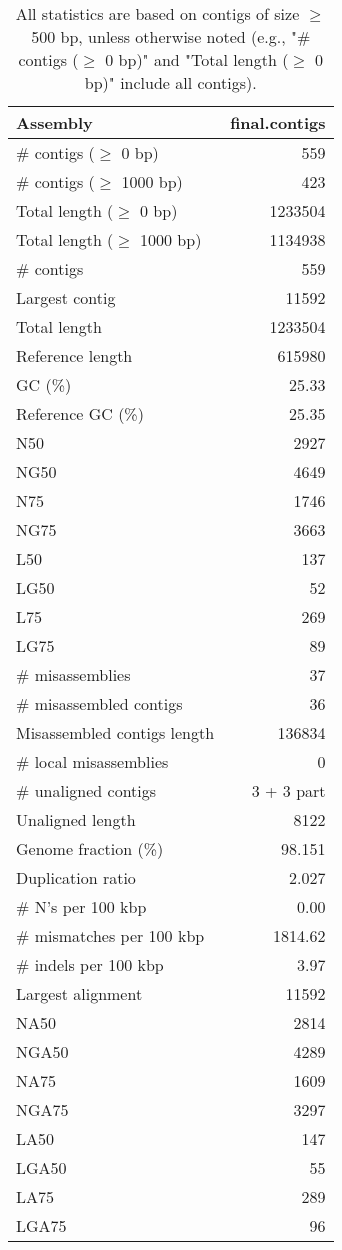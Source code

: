 \documentclass[12pt,a4paper]{article}
\begin{document}
\begin{table}[ht]
\begin{center}
\caption{All statistics are based on contigs of size $\geq$ 500 bp, unless otherwise noted (e.g., "\# contigs ($\geq$ 0 bp)" and "Total length ($\geq$ 0 bp)" include all contigs).}
\begin{tabular}{|l*{1}{|r}|}
\hline
Assembly & final.contigs \\ \hline
\# contigs ($\geq$ 0 bp) & 559 \\ \hline
\# contigs ($\geq$ 1000 bp) & 423 \\ \hline
Total length ($\geq$ 0 bp) & 1233504 \\ \hline
Total length ($\geq$ 1000 bp) & 1134938 \\ \hline
\# contigs & 559 \\ \hline
Largest contig & 11592 \\ \hline
Total length & 1233504 \\ \hline
Reference length & 615980 \\ \hline
GC (\%) & 25.33 \\ \hline
Reference GC (\%) & 25.35 \\ \hline
N50 & 2927 \\ \hline
NG50 & 4649 \\ \hline
N75 & 1746 \\ \hline
NG75 & 3663 \\ \hline
L50 & 137 \\ \hline
LG50 & 52 \\ \hline
L75 & 269 \\ \hline
LG75 & 89 \\ \hline
\# misassemblies & 37 \\ \hline
\# misassembled contigs & 36 \\ \hline
Misassembled contigs length & 136834 \\ \hline
\# local misassemblies & 0 \\ \hline
\# unaligned contigs & 3 + 3 part \\ \hline
Unaligned length & 8122 \\ \hline
Genome fraction (\%) & 98.151 \\ \hline
Duplication ratio & 2.027 \\ \hline
\# N's per 100 kbp & 0.00 \\ \hline
\# mismatches per 100 kbp & 1814.62 \\ \hline
\# indels per 100 kbp & 3.97 \\ \hline
Largest alignment & 11592 \\ \hline
NA50 & 2814 \\ \hline
NGA50 & 4289 \\ \hline
NA75 & 1609 \\ \hline
NGA75 & 3297 \\ \hline
LA50 & 147 \\ \hline
LGA50 & 55 \\ \hline
LA75 & 289 \\ \hline
LGA75 & 96 \\ \hline
\end{tabular}
\end{center}
\end{table}
\end{document}
